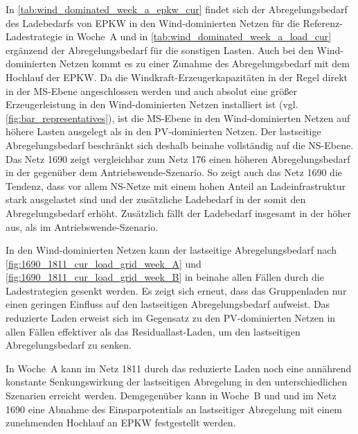 



In \autoref{tab:wind_dominated_week_a_epkw_cur} findet sich der Abregelungsbedarf des Ladebedarfs von \gls{EPKW} in den Wind-dominierten Netzen für die Referenz-Ladestrategie in Woche~A und in \autoref{tab:wind_dominated_week_a_load_cur} ergänzend der Abregelungsbedarf für die sonstigen Lasten.
Auch bei den Wind-dominierten Netzen kommt es zu einer Zunahme des Abregelungsbedarf mit dem Hochlauf der \gls{EPKW}.
Da die Windkraft-Erzeugerkapazitäten in der Regel direkt in der \gls{MS}-Ebene angeschlossen werden und auch absolut eine größer Erzeugerleistung in den Wind-dominierten Netzen installiert ist (vgl. \autoref{fig:bar_representatives}), ist die \gls{MS}-Ebene in den Wind-dominierten Netzen auf höhere Lasten ausgelegt als in den \gls{PV}-dominierten Netzen.
Der lastseitige Abregelungsbedarf beschränkt sich deshalb beinahe vollständig auf die \gls{NS}-Ebene.
Das Netz \num{1690} zeigt vergleichbar zum Netz \num{176} einen höheren Abregelungsbedarf in der \SzeFirmenparkplatz gegenüber dem Antriebswende-Szenario.
So zeigt auch das Netz \num{1690} die Tendenz, dass vor allem \gls{NS}-Netze mit einem hohen Anteil an Ladeinfrastruktur \zH stark ausgelastet sind und der zusätzliche Ladebedarf \zH in der \SzeFirmenparkplatz somit den Abregelungsbedarf erhöht.
Zusätzlich fällt der Ladebedarf insgesamt in der \SzeFirmenparkplatz höher aus, als im Antriebswende-Szenario.





In den Wind-dominierten Netzen kann der lastseitige Abregelungsbedarf nach \autoref{fig:1690_1811_cur_load_grid_week_A} und \autoref{fig:1690_1811_cur_load_grid_week_B} in beinahe allen Fällen durch die Ladestrategien gesenkt werden.
Es zeigt sich erneut, dass das Gruppenladen nur einen geringen Einfluss auf den lastseitigen Abregelungsbedarf aufweist.
Das reduzierte Laden erweist sich im Gegensatz zu den \gls{PV}-dominierten Netzen in allen Fällen effektiver als das Residuallast-Laden, um den lastseitigen Abregelungsbedarf zu senken.\medskip

In Woche~A kann im Netz \num{1811} durch das reduzierte Laden noch eine annährend konstante Senkungswirkung der lastseitigen Abregelung in den unterschiedlichen Szenarien erreicht werden.
Demgegenüber kann in Woche~B und und im Netz \num{1690} eine Abnahme des Einsparpotentials an lastseitiger Abregelung mit einem zunehmenden Hochlauf an \gls{EPKW} festgestellt werden.

